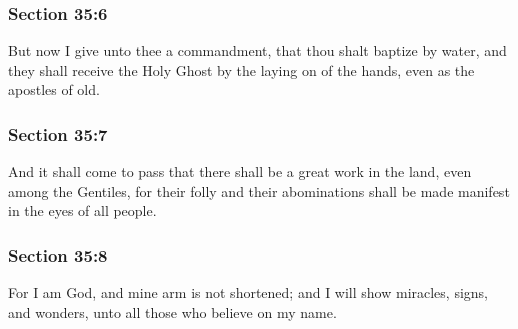 	\subsubsection{Section 35:6} %
		\label{DC35-6}

		But now I give unto thee a commandment, that thou shalt baptize by water, and they shall receive the Holy Ghost by the laying on of the hands, even as the apostles of old.


	\subsubsection{Section 35:7} %
		\label{DC35-7}

		And it shall come to pass that there shall be a great work in the land, even among the Gentiles, for their folly and their abominations shall be made manifest in the eyes of all people.


	\subsubsection{Section 35:8} %
		\label{DC35-8}

		For I am God, and mine arm is not shortened; and I will show miracles, signs, and wonders, unto all those who believe on my name.


